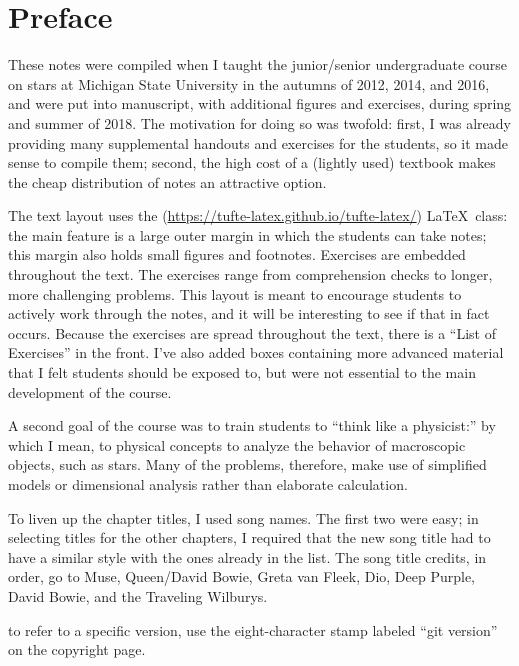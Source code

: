 
\section*{Preface}
These notes were compiled when I taught the junior/senior undergraduate course on stars at Michigan State University in the autumns of 2012, 2014, and 2016, and were put into manuscript, with additional figures and exercises, during spring and summer of 2018. The motivation for doing so was twofold: first, I was already providing many supplemental handouts and exercises for the students, so it made sense to compile them; second, the high cost of a (lightly used) textbook makes the cheap distribution of notes an attractive option.

The text layout uses the  (\url{https://tufte-latex.github.io/tufte-latex/}) \LaTeX\ class: the main feature is a large outer margin in which the students can take notes; this margin also holds small figures and footnotes. Exercises are embedded throughout the text. The exercises range from comprehension checks to longer, more challenging problems. This layout is meant to encourage students to actively work through the notes, and it will be interesting to see if that in fact occurs. Because the exercises are spread throughout the text, there is a ``List of Exercises'' in the front. I've also added boxes containing more advanced material that I felt students should be exposed to, but were not essential to the main development of the course. 

A second goal of the course was to train students to ``think like a physicist:'' by which I mean, to physical concepts to analyze the behavior of macroscopic objects, such as stars. Many of the problems, therefore, make use of simplified models or dimensional analysis rather than elaborate calculation. 

To liven up the chapter titles, I used song names. The first two were easy; in selecting titles for the other chapters, I required that the new song title had to have a similar style with the ones already in the list. The song title credits, in order, go to Muse, Queen/David Bowie, Greta van Fleek, Dio, Deep Purple, David Bowie, and the Traveling Wilburys.

 to refer to a specific version, use the eight-character stamp labeled ``git version'' on the copyright page.

